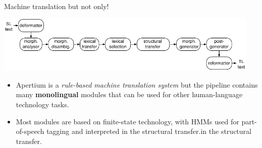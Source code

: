 \documentclass[final]{beamer} %
\newlength{\wideitemsep}
\let\olditem\item
\renewcommand{\item}{\setlength{\itemsep}{\wideitemsep}\olditem}
\begin{document}
\begin{frame}
\begin{columns}
\begin{column}{0.5\textwidth}
\begin{block}{Machine translation but not only!}
\begin{center}
\includegraphics[width=0.95\textwidth]{Images/architecture.pdf}
\end{center}
\begin{itemize}
\item Apertium is a \emph{rule-based machine translation system} but the pipeline contains many \textbf{monolingual} modules that can be used for other human-language technology tasks.
\item Most modules are based on finite-state technology, with HMMs used for part-of-speech tagging and interpreted in the structural transfer.in the structural transfer.
\end{itemize}




\end{block}
\end{column}
\end{columns}
\end{frame}
\end{document}
